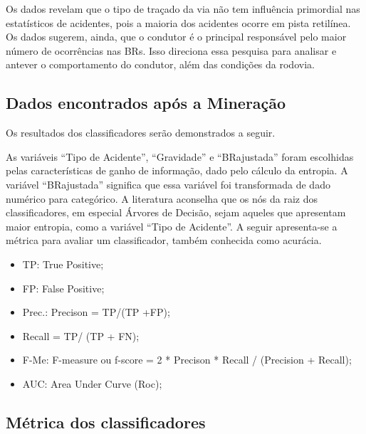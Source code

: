 Os dados revelam que o tipo de traçado da via não tem influência primordial nas estatísticos de acidentes, pois a maioria dos acidentes ocorre em pista retilínea. Os dados sugerem, ainda, que o condutor é o principal responsável pelo maior número de ocorrências nas BRs. Isso direciona essa pesquisa para analisar e antever o comportamento do condutor, além das condições da rodovia.

\pagebreak



\subsection{Dados encontrados após a Mineração}

Os resultados dos classificadores serão demonstrados a
seguir.

As variáveis “Tipo de Acidente”, “Gravidade” e
“BRajustada” foram escolhidas pelas características de ganho
de informação, dado pelo cálculo da entropia. A variável “BRajustada”
significa que essa variável foi transformada de dado numérico para categórico. A literatura \cite{NorvigRussel2004} aconselha que os nós da raiz dos classificadores, em especial Árvores de Decisão, sejam aqueles que apresentam maior
entropia, como a variável “Tipo de Acidente”.  
A seguir apresenta-se a métrica para avaliar um classificador, também conhecida como acurácia.

\begin{itemize}
	\item TP: True Positive;
	\item FP: False Positive;
	\item Prec.: Precison = TP/(TP +FP);
	\item Recall = TP/ (TP + FN);
	\item F-Me: F-measure ou f-score = 2 * Precison * Recall / (Precision + Recall);
	\item AUC: Area Under Curve (Roc);
\end{itemize}
    
\subsection{Métrica dos classificadores}

